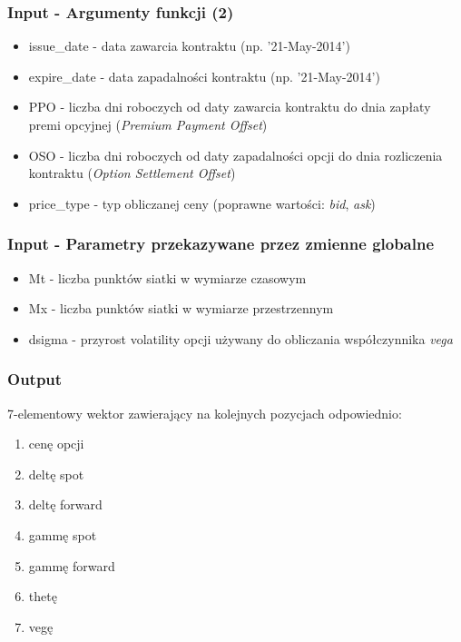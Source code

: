 \documentclass{beamer}
\begin{document}
\begin{frame}
  \frametitle{Input - Argumenty funkcji (2)}
\begin{itemize}

\item issue\_date - data zawarcia kontraktu (np. '21-May-2014')
\item expire\_date - data zapadalności kontraktu (np. '21-May-2014') 
\item PPO - liczba dni roboczych od daty zawarcia kontraktu do dnia zapłaty premi opcyjnej (\emph{Premium Payment Offset})
\item OSO - liczba dni roboczych od daty zapadalności opcji do dnia rozliczenia kontraktu (\emph{Option Settlement Offset})
\item price\_type - typ obliczanej ceny (poprawne wartości: \emph{bid}, \emph{ask})
\end{itemize}

\end{frame}

\begin{frame}
  \frametitle{Input - Parametry przekazywane przez zmienne globalne}

\begin{itemize}
\item Mt - liczba punktów siatki w wymiarze czasowym
\item Mx - liczba punktów siatki w wymiarze przestrzennym
\item dsigma - przyrost volatility opcji używany do obliczania współczynnika \emph{vega}
\end{itemize}

\end{frame}

\begin{frame}
  \frametitle{Output}

7-elementowy wektor zawierający na kolejnych pozycjach odpowiednio:

\begin{enumerate}
\item  cenę opcji \item deltę spot\item deltę forward\item gammę spot\item gammę forward\item thetę \item vegę
\end{enumerate}
\end{frame}
\end{document}
